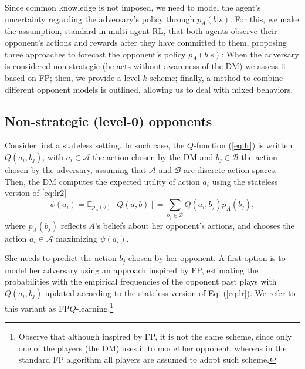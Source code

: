 Since common knowledge is not imposed,
we need to model the agent's uncertainty regarding the
adversary's policy through  $p_A (b | s)$.
 For this, we make the 
 assumption, standard in multi-agent RL, that both agents observe their opponent's actions and rewards
 after they have committed to them, proposing three approaches to forecast the opponent's policy $p_A (b | s)$:  %
When the adversary is considered non-strategic
(he acts without awareness of the DM) we assess it based 
on FP; then, we provide a level-$k$ scheme;
finally, a method to combine different opponent models
is outlined, allowing us to deal with mixed behaviors.

\subsection{Non-strategic (level-0) opponents}\label{sec:non}

Consider first a stateless setting. In such case, 
the $Q$-function (\ref{eq:lr}) is written
  $Q(a_i,b_j)$, with $a_i \in \mathcal{A}$ the action chosen by
 the DM and $b_j \in \mathcal{B}$ the action chosen by the adversary, assuming that $\mathcal{A}$ and $\mathcal{B}$ are discrete action spaces.
 Then, the DM  computes the expected utility of action $a_i$ using the stateless version of \eqref{eq:lr2}
\[ \psi(a_i) = \mathbb{E}_{p_A(b)} [Q(a,b)] = \sum_{b_j \in \mathcal{B}} Q(a_i, b_j) p_{A}(b_j), \]
where $p_A (b_j)$ reflects $A$'s beliefs about her opponent's actions,
 and chooses the action $a_i \in \mathcal{A}$
maximizing $\psi(a_i)$.
 
 She needs to predict the action
 $b_j$ chosen by her opponent. A first option is to model her adversary
 using an approach inspired by FP, 
 estimating the probabilities with the empirical frequencies of the opponent past plays
 with $Q(a_i, b_j)$ updated according to the stateless version of Eq. (\eqref{eq:lr}).
We refer to this variant as
FP$Q$-learning.\footnote{Observe that although inspired by FP,
it is not the same scheme, since only one of the players (the DM) uses it to 
model her opponent, whereas in the standard FP algorithm \parencite{brown1951iterative} all players 
are assumed to adopt such scheme.}

